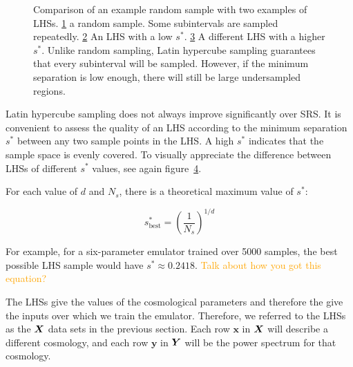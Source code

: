 \begin{figure}[ht!]
    \begin{subfigure}{0.32 \textwidth}
    \centering
 		
 		\caption{}
 		\label{fig: random_sample}
    \end{subfigure}
    \begin{subfigure}{0.32 \textwidth}
    \centering
 		
 		\caption{}
 		\label{fig: poor_lhs}
    \end{subfigure}
    \begin{subfigure}{0.32 \textwidth}
    \centering
 		
 		\caption{}
 		\label{fig: better_lhs}
    \end{subfigure}
    \centering
    \caption[Comparison of SRS and Latin hypercube sampling.]{Comparison of an 
    example
    	random sample with two examples of LHSs.
    	\ref{fig: random_sample} a random sample.
    	Some subintervals are sampled repeatedly.
	\ref{fig: poor_lhs} An LHS with a low $s^*$.    	
    	\ref{fig: better_lhs} A different LHS with a higher $s^*$.
    	Unlike random sampling,
    	Latin hypercube sampling guarantees that every subinterval will be 
    	sampled. However, if
    	the minimum separation is low enough, there will still be large
    	undersampled regions.}
    \label{fig: sample_comparison}
\end{figure}

Latin hypercube sampling does not always improve significantly over SRS. It is 
convenient to
assess the quality of an LHS according to the minimum separation $s^*$ 
between any two sample points in the LHS. A high $s^*$ indicates that 
the sample space is evenly covered. To visually appreciate the difference 
between LHSs of different $s^*$ values, see again
figure~\ref{fig: sample_comparison}.

For each value of $d$ and $N_s$, there is a theoretical maximum value of
$s^*$:

\begin{equation}
\label{eq: best_lhs_sep}
s^*_\text{best} = \left( \frac{1}{N_s} \right)^{1 / d}
\end{equation}

For example, for a six-parameter emulator trained over 5000 samples, the best
possible LHS sample would have $s^* \approx 0.2418$.
\textcolor{orange}{Talk about how you got this equation?}

The LHSs give the values of the cosmological parameters and therefore
the give the inputs over which we train the emulator.
Therefore, we referred to the LHSs as the
$\bm{X}$ data sets in the previous section. Each
row $\bm{x}$ in $\bm{X}$ will describe a different cosmology, and each
row $\bm{y}$ in $\bm{Y}$ will be the power spectrum for that cosmology.

